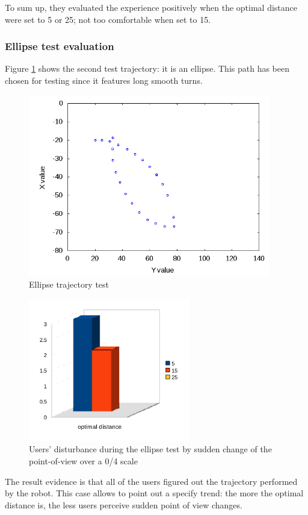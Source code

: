 %
To sum up, they evaluated the experience positively when the
optimal distance were set to 5 or 25; not too comfortable
when set to 15.
%
\subsubsection{Ellipse test evaluation}
\label{subsubsec:ellipsetest}
Figure \ref{fig:ellipsetest} shows the second test trajectory:
it is an ellipse. This path has been chosen for testing since it
features long smooth turns.
%
\begin{figure}[!h]
  \begin{center}
    \includegraphics[width=300pt]{img/path_session_5.png}
    \caption{Ellipse trajectory test}
    \label{fig:ellipsetest}
  \end{center}
\end{figure}
%
\begin{figure}[!h]
  \begin{center}
    \includegraphics[width=200pt]{img/ellipse.png}
    \caption{Users' disturbance during the ellipse test 
      by sudden change of the point-of-view over a 0/4 scale}
  \end{center}
\end{figure}
%
The result evidence is that all of the users figured out the
trajectory performed by the robot. This case allows to point out
a specify trend: the more the optimal distance is, the less users
perceive sudden point of view changes.
%

